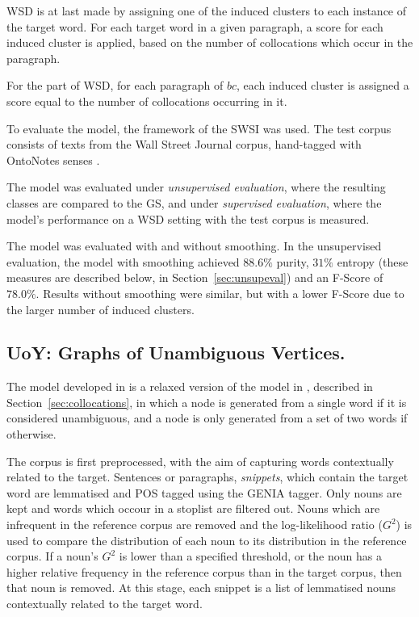 \ac{WSD} is at last made by assigning one of the induced clusters to each
instance of the target word. For each target word in a given paragraph, a score
for each induced cluster is applied, based on the number of collocations which
occur in the paragraph.

For the part of \ac{WSD}, for each paragraph of $bc$, each induced cluster is
assigned a score equal to the number of collocations occurring in it.

To evaluate the model, the framework of the \ac{SWSI} \cite{agirre2007semeval}
was used. The test corpus consists of texts from the Wall Street Journal
corpus, hand-tagged with OntoNotes senses \cite{hovy2006ontonotes}.

The model was evaluated under \textit{unsupervised evaluation}, where the
resulting classes are compared to the \ac{GS}, and under \textit{supervised
evaluation}, where the model's performance on a \ac{WSD} setting with the
test corpus is measured.

The model was evaluated with and without smoothing. In the unsupervised
evaluation, the model with smoothing achieved $88.6\%$ purity, $31\%$ entropy
(these measures are described below, in Section~\ref{sec:unsupeval}) and an
F-Score of $78.0\%$. Results without smoothing were similar, but with a lower
F-Score due to the larger number of induced clusters.

\subsection{UoY: Graphs of Unambiguous Vertices.}

The model developed in \cite{korkontzelos2010uoy} is a relaxed version of the
model in \cite{klapaftis2008word}, described in Section~\ref{sec:collocations},
in which a node is generated from a single word if it is considered unambiguous,
and a node is only generated from a set of two words if otherwise.

The corpus is first preprocessed, with the aim of capturing words contextually
related to the target. Sentences or paragraphs, \textit{snippets}, which contain
the target word are lemmatised and \ac{POS} tagged using the GENIA tagger. Only
nouns are kept and words which occour in a stoplist are filtered out. Nouns
which are infrequent in the reference corpus are removed and the log-likelihood
ratio ($G^2$) is used to compare the distribution of each noun to its
distribution in the reference corpus. If a noun's $G^2$ is lower than a
specified threshold, or the noun has a higher relative frequency in the
reference corpus than in the target corpus, then that noun is removed. At this
stage, each snippet is a list of lemmatised nouns contextually related to the
target word.

